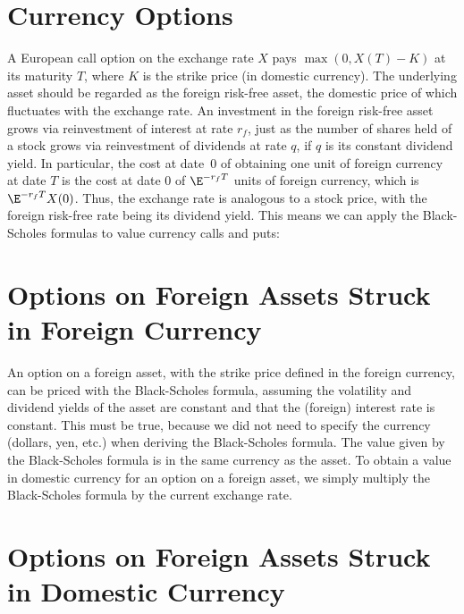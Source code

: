 \section{Currency Options}
A European call option on the exchange rate $X$ pays $\max(0,X(T)-K)$ at its maturity $T$, where $K$ is the strike price (in domestic currency).  The underlying asset should be regarded as the foreign risk-free asset, the domestic price of which fluctuates with the exchange rate.   An investment in the foreign risk-free asset grows via reinvestment of interest at rate $r_f$, just as the number of shares held of a stock grows via reinvestment of dividends at rate $q$, if $q$ is its constant dividend yield.  In particular, the cost at date~0 of obtaining one unit of foreign currency at date $T$ is the cost at date 0 of $\E^{-r_fT}$ units of foreign currency, which is $\E^{-r_fT}X(0)$.  Thus, the exchange rate is analogous to a stock price, with the foreign risk-free rate being its dividend yield.  This means we can apply the Black-Scholes formulas to value currency calls and puts:




\section{Options on Foreign Assets Struck in Foreign Currency}\label{s_foreignstrike}
An option on a foreign asset, with the strike price defined in the foreign currency, can be priced with the Black-Scholes formula, assuming the volatility and dividend yields of the asset are constant and that the (foreign) interest rate is constant.  This must be true, because we did not need to specify the currency (dollars, yen, etc.) when deriving the Black-Scholes formula.  The value given by the Black-Scholes formula is in the same currency as the asset.  To obtain a value in domestic currency for an option on a foreign asset, we simply multiply the Black-Scholes formula by the current exchange rate.

\section{Options on Foreign Assets Struck in Domestic Currency}\label{s_domesticstrike}

